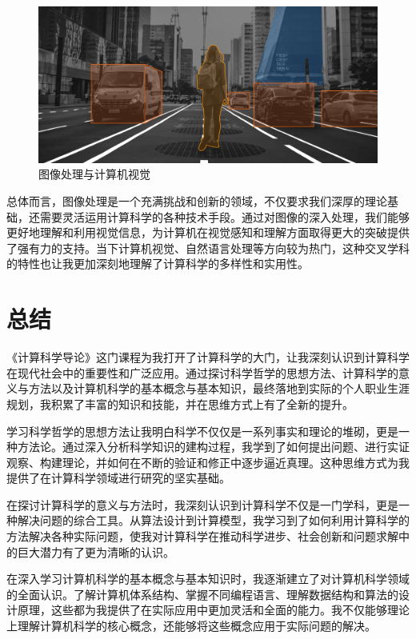 \documentclass[square]{article}
\begin{document}
\begin{figure}[h!]
	\centering
	\includegraphics[width=12cm]{tuxiang.png}
	\caption{图像处理与计算机视觉}
	\label{fig:tuxiang}
\end{figure}

总体而言，图像处理是一个充满挑战和创新的领域，不仅要求我们深厚的理论基础，还需要灵活运用计算科学的各种技术手段。通过对图像的深入处理，我们能够更好地理解和利用视觉信息，为计算机在视觉感知和理解方面取得更大的突破提供了强有力的支持。当下计算机视觉、自然语言处理等方向较为热门，这种交叉学科的特性也让我更加深刻地理解了计算科学的多样性和实用性。



\section{总结}

《计算科学导论》这门课程为我打开了计算科学的大门，让我深刻认识到计算科学在现代社会中的重要性和广泛应用。通过探讨科学哲学的思想方法、计算科学的意义与方法以及计算机科学的基本概念与基本知识，最终落地到实际的个人职业生涯规划，我积累了丰富的知识和技能，并在思维方式上有了全新的提升。

学习科学哲学的思想方法让我明白科学不仅仅是一系列事实和理论的堆砌，更是一种方法论。通过深入分析科学知识的建构过程，我学到了如何提出问题、进行实证观察、构建理论，并如何在不断的验证和修正中逐步逼近真理。这种思维方式为我提供了在计算科学领域进行研究的坚实基础。

在探讨计算科学的意义与方法时，我深刻认识到计算科学不仅是一门学科，更是一种解决问题的综合工具。从算法设计到计算模型，我学习到了如何利用计算科学的方法解决各种实际问题，使我对计算科学在推动科学进步、社会创新和问题求解中的巨大潜力有了更为清晰的认识。

在深入学习计算机科学的基本概念与基本知识时，我逐渐建立了对计算机科学领域的全面认识。了解计算机体系结构、掌握不同编程语言、理解数据结构和算法的设计原理，这些都为我提供了在实际应用中更加灵活和全面的能力。我不仅能够理论上理解计算机科学的核心概念，还能够将这些概念应用于实际问题的解决。
\end{document}
